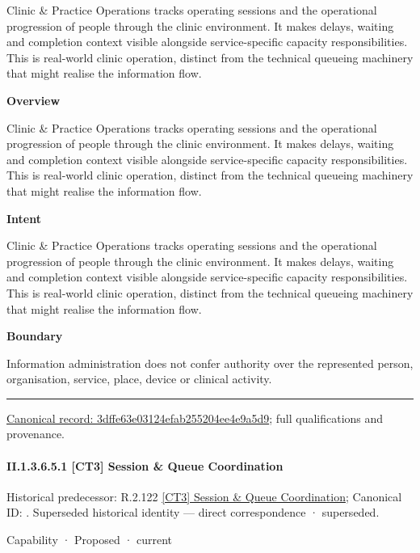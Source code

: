 Clinic \& Practice Operations tracks operating sessions and the operational progression of people through the clinic environment. It makes delays, waiting and completion context visible alongside service-specific capacity responsibilities. This is real-world clinic operation, distinct from the technical queueing machinery that might realise the information flow.



\textbf{Overview}



Clinic \& Practice Operations tracks operating sessions and the operational progression of people through the clinic environment. It makes delays, waiting and completion context visible alongside service-specific capacity responsibilities. This is real-world clinic operation, distinct from the technical queueing machinery that might realise the information flow.



\textbf{Intent}



Clinic \& Practice Operations tracks operating sessions and the operational progression of people through the clinic environment. It makes delays, waiting and completion context visible alongside service-specific capacity responsibilities. This is real-world clinic operation, distinct from the technical queueing machinery that might realise the information flow.



\textbf{Boundary}



Information administration does not confer authority over the represented person, organisation, service, place, device or clinical activity.



\medskip\hrule\medskip

{\footnotesize \href{../../../../continuum/strategy/capability/3dffe63e03124efab255204ee4e9a5d9.md}{Canonical record: 3dffe63e03124efab255204ee4e9a5d9}; full qualifications and provenance.}\par
\paragraph*{II.1.3.6.5.1 [CT3] Session \& Queue Coordination}
\label{navigation:II.1.3.6.5.1}

{\small Historical predecessor: R.2.122 \hyperref[element:5298c6170cef4f05a6d956da716071bd]{[CT3] Session \& Queue Coordination}; Canonical ID: \texttt{}. Superseded historical identity — direct correspondence · superseded.}\par
\label{element:22981a95ca6e466582363706fde8fceb}
{\small Capability · Proposed · current}\par

